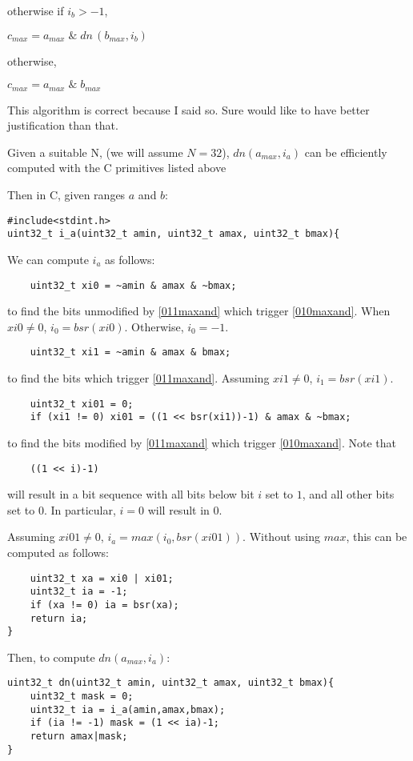 \documentclass{article}
\begin{document}
otherwise if $i_b > -1$,

\quad $c_{max} = a_{max} \; \text{\&} \; dn\,(b_{max},i_b) $

otherwise,

\quad $c_{max} = a_{max} \; \text{\&} \; b_{max} $
\vspace{10pt}

This algorithm is correct because I said so. Sure would like to have 
better justification than that.
\vspace{10pt}

Given a suitable N, (we will assume $N=32$),
$dn(a_{max},i_a)$ can be efficiently computed with the C 
primitives listed above

Then in C, given ranges $a$ and $b$:
\begin{lstlisting}
#include<stdint.h>
uint32_t i_a(uint32_t amin, uint32_t amax, uint32_t bmax){
\end{lstlisting}
We can compute $i_a$ as follows:

\begin{lstlisting}
    uint32_t xi0 = ~amin & amax & ~bmax;
\end{lstlisting}
to find the bits unmodified by \eqref{011maxand} which trigger \eqref{010maxand}. 
When $xi0 \ne 0$, $i_0 = bsr(xi0)$. Otherwise, $i_0 = -1$.
\begin{lstlisting}
    uint32_t xi1 = ~amin & amax & bmax;
\end{lstlisting}
to find the bits which trigger \eqref{011maxand}. 
Assuming $xi1 \ne 0$, $i_1 = bsr(xi1)$.
\begin{lstlisting}
    uint32_t xi01 = 0;
    if (xi1 != 0) xi01 = ((1 << bsr(xi1))-1) & amax & ~bmax;
\end{lstlisting}
to find the bits modified by \eqref{011maxand} which trigger \eqref{010maxand}.
Note that
\begin{lstlisting}
    ((1 << i)-1) 
\end{lstlisting}
will result in a bit sequence with all bits below bit $i$ set to $1$, and 
all other bits set to $0$. In particular, $i=0$ will result in $0$. 

Assuming $xi01 \ne 0$, $i_a = max(i_0, bsr(xi01))$. Without using $max$,
this can be computed as follows:
\begin{lstlisting}
    uint32_t xa = xi0 | xi01;
    uint32_t ia = -1;
    if (xa != 0) ia = bsr(xa);
    return ia;
}
\end{lstlisting}

Then, to compute $dn(a_{max}, i_a)$:
\begin{lstlisting}
uint32_t dn(uint32_t amin, uint32_t amax, uint32_t bmax){
    uint32_t mask = 0;
    uint32_t ia = i_a(amin,amax,bmax);
    if (ia != -1) mask = (1 << ia)-1;
    return amax|mask;
}
\end{lstlisting}
\end{document}
